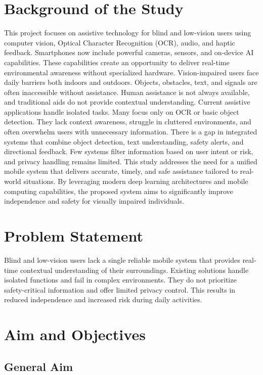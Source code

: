 \documentclass[12pt,a4paper]{report}
\begin{document}
\section{Background of the Study}

This project focuses on assistive technology for blind and low-vision users using computer vision, Optical Character Recognition (OCR), audio, and haptic feedback. Smartphones now include powerful cameras, sensors, and on-device AI capabilities. These capabilities create an opportunity to deliver real-time environmental awareness without specialized hardware. Vision-impaired users face daily barriers both indoors and outdoors. Objects, obstacles, text, and signals are often inaccessible without assistance. Human assistance is not always available, and traditional aids do not provide contextual understanding. Current assistive applications handle isolated tasks. Many focus only on OCR or basic object detection. They lack context awareness, struggle in cluttered environments, and often overwhelm users with unnecessary information. There is a gap in integrated systems that combine object detection, text understanding, safety alerts, and directional feedback. Few systems filter information based on user intent or risk, and privacy handling remains limited. This study addresses the need for a unified mobile system that delivers accurate, timely, and safe assistance tailored to real-world situations. By leveraging modern deep learning architectures and mobile computing capabilities, the proposed system aims to significantly improve independence and safety for visually impaired individuals.

\section{Problem Statement}

Blind and low-vision users lack a single reliable mobile system that provides real-time contextual understanding of their surroundings. Existing solutions handle isolated functions and fail in complex environments. They do not prioritize safety-critical information and offer limited privacy control. This results in reduced independence and increased risk during daily activities.

\section{Aim and Objectives}

\subsection{General Aim}
\end{document}
